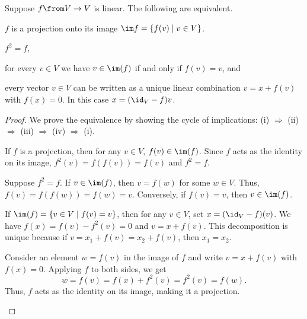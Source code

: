 \documentclass[a4paper,oneside, 12pt]{amsart}
\begin{document}
\begin{lemma}\label{lem:equivalent-characterisations-projections}
  Suppose \(f \from V\to V\) is linear.
  The following are equivalent.
  \begin{thmlist}
    \item \(f\) is a projection onto its image \(\im f =\{f(v) \mid v\in V\}\).
    \item\(f^{2} = f\),
    \item for every  \(v\in V\) we have \(v\in \im(f)\) if and only if \(f(v) = v\), and
    \item every vector \(v\in V\) can be written as a unique linear combination \(v= x+f(v)\) with \(f(x) = 0\).
    In this case \(x= (\id_{V} -f) v\).
  \end{thmlist}
\end{lemma}
\begin{proof}
  We prove the equivalence by showing the cycle of implications: (i) \(\Rightarrow\) (ii) \(\Rightarrow\) (iii) \(\Rightarrow\) (iv) \(\Rightarrow\) (i).

  \begin{thmlist}[leftmargin=5em]
    \item[(i) \(\Rightarrow\) (ii):]
    If \( f \) is a projection, then for any \( v \in V \), \( f(v) \in \im(f) \). Since \( f \) acts as the identity on its image, \( f^2(v) = f(f(v)) = f(v) \) and \( f^2 = f \).

    \item[(ii) \(\Rightarrow\) (iii):]
    Suppose \( f^2 = f \). If \( v \in \im(f) \), then \( v = f(w) \) for some \( w \in V \). Thus, \( f(v) = f(f(w)) = f(w) = v \). Conversely, if \( f(v) = v \), then \( v \in \im(f) \).

    \item[(iii) \(\Rightarrow\) (iv):]
    If \( \im(f) = \{ v \in V \mid f(v) = v \} \), then for any \( v \in V \), set \( x = (\id_V - f)(v) \). We have \( f(x) = f(v) - f^2(v) = 0 \) and \( v = x + f(v) \). This decomposition is unique because if \( v = x_1 + f(v) = x_2 + f(v) \), then \( x_1 = x_2 \).

    \item[(iv) \(\Rightarrow\) (i):]
    Consider an element \( w = f(v) \) in the image of \(f\) and write \( v = x + f(v) \) with \( f(x) = 0 \).
    Applying \( f \) to both sides, we get
    \begin{equation*}
      w = f(v) = f(x) + f^2(v) = f^2(v) = f(w) .
    \end{equation*}
    Thus, \(f\)  acts as the identity on its image, making it a projection. \qedhere
  \end{thmlist}
\end{proof}
\end{document}
